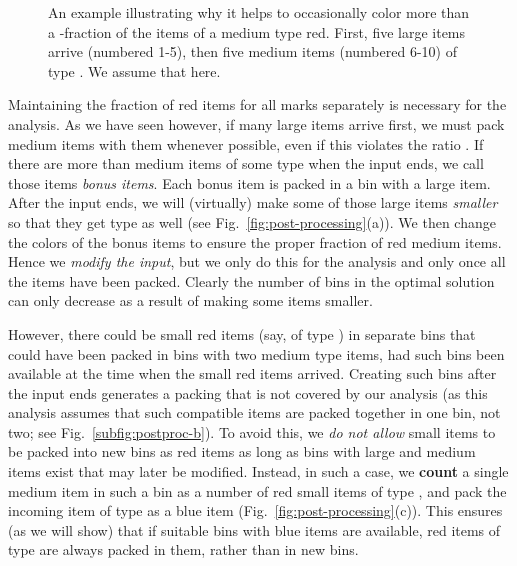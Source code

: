 \begin{figure}
	\centering
	\hspace{7mm}
	\caption{An example illustrating why it helps to occasionally color more than a -fraction of the items of a medium type  red. First, five large items arrive (numbered 1-5), then five medium items (numbered 6-10) of type . We assume that  here. \label{fig:all-medium-red}}
\end{figure}


Maintaining the fraction  of red items for all marks separately is necessary for the analysis. 
As we have seen however, if many large items arrive first, we must pack medium items with them whenever possible,
even if this violates the ratio . 
If there are more than  medium items of some type  when the input ends,
we call those items \emph{bonus items}. Each bonus item is packed in a bin with a large item.
After the input ends, we will (virtually) make some of those large items \emph{smaller} so that they get 
type  as well (see Fig.~\ref{fig:post-processing}(a)).
We then change the colors of the bonus items to ensure the proper fraction
 of red medium items.
Hence we \emph{modify the input}, but we only do this for the analysis and only once all the items have been packed.
Clearly the number of bins in the optimal solution can only decrease as a result of making some items smaller.

However,
there could be small red items (say, of type ) in separate bins that could have been packed in bins with two medium type  items, 
had such bins been available at the time when the small red items arrived. Creating such bins after the input ends generates a packing that 
is not covered by our analysis (as this analysis assumes that such compatible items are packed together in one bin, not two; see Fig.~\ref{subfig:postproc-b}).
To avoid this, we \emph{do not allow} small items to be packed into new bins as red items as long as bins with large and medium items exist that may later be modified. Instead, in such a case, we \textbf{count} a single medium item in such a bin as a number of red small items of type , and pack the incoming item of type  as a blue item (Fig.~\ref{fig:post-processing}(c)).
This ensures (as we will show) that if suitable bins with blue items are available,
red items of type  are always packed in them, rather than in new bins.

